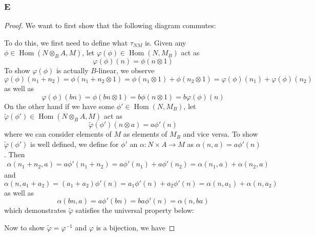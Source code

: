 \documentclass{article}
\DeclareMathOperator{\Hom}{\mathrm{Hom}}
\begin{document}
\subsubsection{E}\label{1.5.E}
\begin{proof}
    We want to first show that the following diagram commutes:
    \begin{center}
    \end{center}
    To do this, we first need to define what $\tau_{NM}$ is. Given any $\phi \in \Hom(N\otimes_B A,M)$, let $\varphi(\phi)\in \Hom(N,M_B)$ act as
    \[
    \varphi(\phi)(n)=\phi(n\otimes 1)
    \]
    To show $\varphi(\phi)$ is actually $B$-linear, we observe
    \[
    \varphi(\phi)(n_1+n_2)=\phi(n_1+n_2\otimes 1)=\phi(n_1\otimes 1)+\phi(n_2\otimes 1)=\varphi(\phi)(n_1)+\varphi(\phi)(n_2)
    \]
    as well as
    \[
    \varphi(\phi)(bn)=\phi(bn\otimes 1)=b\phi(n\otimes 1)=b\varphi(\phi)(n)
    \]
    On the other hand if we have some $\phi'\in \Hom(N,M_B)$, let $\tilde \varphi(\phi')\in \Hom(N\otimes_BA,M)$ act as
    \[
    \tilde \varphi(\phi')(n\otimes a)=a \phi'(n)
    \]
    where we can consider elements of $M$ as elements of $M_B$ and vice versa. To show $\tilde \varphi(\phi')$ is well defined, we define for $\phi'$ an $\alpha:N\times A\to M$ as $\alpha(n,a)=a\phi'(n)$. Then
    \begin{align*}
        \alpha(n_1+n_2,a)=a \phi'(n_1+n_2)=a\phi'(n_1)+a \phi'(n_2)=\alpha(n_1,a)+\alpha(n_2,a)
    \end{align*}
    and
    \[
    \alpha(n,a_1+a_2)=(a_1+a_2)\phi'(n)=a_1 \phi'(n)+a_2 \phi'(n)=\alpha(n,a_1)+\alpha(n,a_2)
    \]
    as well as
    \[
    \alpha(bn,a)=a\phi'(bn)=ba\phi'(n)=\alpha(n,ba)
    \]
    which demonstrates $\tilde \varphi$ satisfies the universal property below:
    \begin{center}
    \end{center}
    Now to show $\tilde \varphi=\varphi^{-1}$ and $\varphi$ is a bijection, we have

\end{proof}
\end{document}
